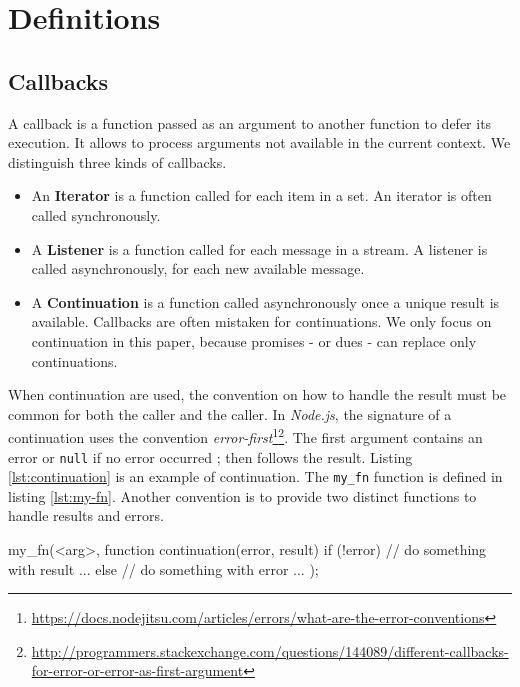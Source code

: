 \section{Definitions} \label{section:definitions}

\subsection{Callbacks} \label{section:definitions:callback}

A callback is a function passed as an argument to another function to defer its execution.
It allows to process arguments not available in the current context.
We distinguish three kinds of callbacks.
\begin{itemize}
  \item An \textbf{Iterator} is a function called for each item in a set.
  An iterator is often called synchronously.
  \item A \textbf{Listener} is a function called for each message in a stream.
  A listener is called asynchronously, for each new available message.
  \item A \textbf{Continuation} is a function called asynchronously once a unique result is available.
  Callbacks are often mistaken for continuations.
  We only focus on continuation in this paper, because promises - or dues - can replace only continuations.
\end{itemize}

When continuation are used, the convention on how to handle the result must be common for both the caller and the caller.
In \textit{Node.js}, the signature of a continuation uses the convention \textit{error-first}\footnote{\label{ftn:error-first}\url{https://docs.nodejitsu.com/articles/errors/what-are-the-error-conventions}}\footnote{\url{http://programmers.stackexchange.com/questions/144089/different-callbacks-for-error-or-error-as-first-argument}}.
The first argument contains an error or \texttt{null} if no error occurred ; then follows the result.
Listing \ref{lst:continuation} is an example of continuation.
The \texttt{my_fn} function is defined in listing \ref{lst:my-fn}.
Another convention is to provide two distinct functions to handle results and errors. 

\begin{code}[js, %
             caption={Example of a continuation}, %
             label={lst:continuation}] %
my_fn(<arg>, function continuation(error, result) {
  if (!error) {
    // do something with result ...
  } else {
    // do something with error ...
  }
});
\end{code}

